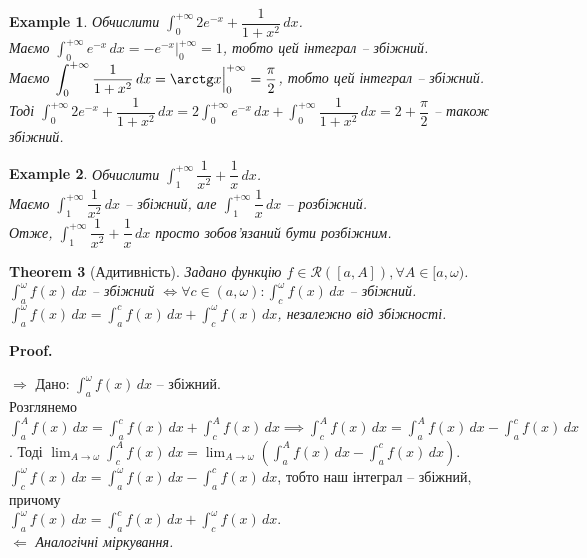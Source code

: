 \documentclass[a4paper, 10pt]{article}
\makeatletter
\def\huge{\displaystyle}
\def\qed{$\blacksquare$}
\def\rightproof{$\boxed{\Rightarrow}$ }
\def\leftproof{$\boxed{\Leftarrow}$ }
\theoremstyle{theoremdd}
\newtheorem{theorem}{Theorem}[subsection]
\theoremstyle{theoremdd}
\theoremstyle{theoremdd}
\theoremstyle{theoremdd}
\theoremstyle{theoremdd}
\newtheorem{example}[theorem]{Example}
\theoremstyle{theoremdd}
\theoremstyle{theoremdd}
\theoremstyle{theoremdd}
\theoremstyle{theoremdd}
\renewenvironment{proof}[1][Proof.\\]{\par
\pushQED{\hfill \qed}%
\normalfont \topsep6\p@\@plus6\p@\relax
\trivlist
\item\relax
{\bfseries
#1\@addpunct{.}}\hspace\labelsep\ignorespaces
}{%
\popQED\endtrivlist\@endpefalse
}
\makeatother
\begin{document}
\begin{example}
Обчислити $\huge\int_0^{+\infty} 2e^{-x} + \dfrac{1}{1+x^2}\,dx$.\\
Маємо $\huge\int_0^{+\infty} e^{-x}\,dx = -e^{-x} \Big|_0^{+\infty} = 1$, тобто цей інтеграл -- збіжний.\\
Маємо $\huge\int_0^{+\infty} \dfrac{1}{1+x^2}\,dx = \arctg x \Big|_0^{+\infty} = \dfrac{\pi}{2}$, тобто цей інтеграл -- збіжний.\\
Тоді $\huge\int_0^{+\infty} 2e^{-x} + \dfrac{1}{1+x^2}\,dx = 2 \int_0^{+\infty} e^{-x}\,dx + \int_0^{+\infty} \dfrac{1}{1+x^2}\,dx = 2 + \dfrac{\pi}{2}$ -- також збіжний.
\end{example}

\begin{example}
Обчислити $\displaystyle\int_1^{+\infty} \dfrac{1}{x^2} + \dfrac{1}{x}\,dx$.\\
Маємо $\displaystyle\int_1^{+\infty} \dfrac{1}{x^2}\,dx$ -- збіжний, але $\displaystyle\int_1^{+\infty} \dfrac{1}{x}\,dx$ -- розбіжний.\\
Отже, $\displaystyle\int_1^{+\infty} \dfrac{1}{x^2} + \dfrac{1}{x}\,dx$ просто зобов'язаний бути розбіжним.
\end{example}

\begin{theorem}[Адитивність]
Задано функцію $f \in \mathcal{R}([a,A]), \forall A \in [a,\omega)$.\\
$\huge\int_a^\omega f(x)\,dx$ -- збіжний $\iff \forall c \in (a,\omega): \huge\int_c^\omega f(x)\,dx$ -- збіжний. \\ 
$\huge\int_a^\omega f(x)\,dx = \int_a^c f(x)\,dx + \int_c^\omega f(x)\,dx$, незалежно від збіжності.
\end{theorem}

\begin{proof}
\rightproof Дано: $\huge\int_a^\omega f(x)\,dx$ -- збіжний.\\
Розглянемо $\huge\int_a^A f(x)\,dx = \int_a^c f(x)\,dx + \int_c^A f(x)\,dx \implies \int_c^A f(x)\,dx = \huge\int_a^A f(x)\,dx - \int_a^c f(x)\,dx$.
Тоді $\huge\lim_{A \to \omega} \int_c^A f(x)\,dx = \huge\lim_{A \to \omega} \left( \int_a^A f(x)\,dx - \int_a^c f(x)\,dx \right)$.\\
$\huge\int_c^\omega f(x)\,dx = \int_a^\omega f(x)\,dx - \int_a^c f(x)\,dx$, тобто наш інтеграл -- збіжний, причому\\
$\huge\int_a^\omega f(x)\,dx = \int_a^c f(x)\,dx + \int_c^\omega f(x)\,dx$.
\bigskip \\
\leftproof \textit{Аналогічні міркування.}
\end{proof}
\end{document}
